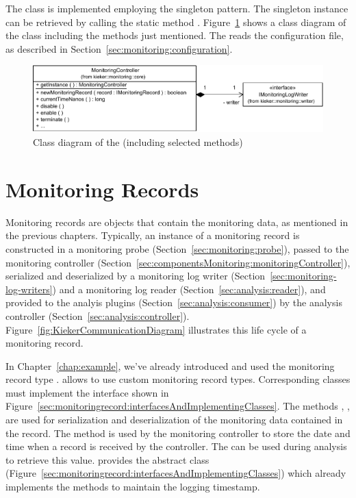 The class  is implemented employing the singleton pattern. %
The singleton instance %
can be retrieved by calling the static method . %
Figure~\ref{fig:monitoringController:classdiagram} shows %
a class diagram of the class  including the methods 
just mentioned. The  reads the configuration %
file, as described in Section~\ref{sec:monitoring:configuration}.

\begin{figure}[H]\centering
\includegraphics[scale=0.7]{images/kieker_monitoringControlleruserguide-simplified}
\caption{Class diagram of the  (including selected methods)}
\label{fig:monitoringController:classdiagram}
\end{figure}

\section{Monitoring Records}\label{sec:componentsMonitoring:monitoringRecords}

Monitoring records are objects that contain the monitoring data, as mentioned %
in the previous chapters. Typically, an instance of a monitoring record is %
constructed in a monitoring probe (Section~\ref{sec:monitoring:probe}), %
passed to the monitoring controller (Section~\ref{sec:componentsMonitoring:monitoringController}), %
serialized and deserialized by a monitoring %
log writer (Section~\ref{sec:monitoring-log-writers}) and a
monitoring log reader (Section~\ref{sec:analysis:reader}), and provided to the %
analyis plugins (Section~\ref{sec:analysis:consumer}) %
by the analysis controller (Section~\ref{sec:analysis:controller}). %
Figure~\ref{fig:KiekerCommunicationDiagram} illustrates this life cycle of a monitoring %
record. %

In Chapter~\ref{chap:example}, we've already introduced and used the monitoring %
record type . \Kieker{} allows to use custom %
monitoring record types. Corresponding classes must implement the %
interface  shown in Figure~\ref{sec:monitoringrecord:interfacesAndImplementingClasses}. %
The methods , ,  %
are used for serialization and deserialization of the monitoring data contained %
in the record. The method  is used by the monitoring controller to %
store the date and time when a record is received by the controller. %
The  can be used during analysis to retrieve %
this value. \KiekerMonitoringPart{} provides the abstract class %
 (Figure~\ref{sec:monitoringrecord:interfacesAndImplementingClasses}) %
which already implements the methods to maintain the logging timestamp. 


